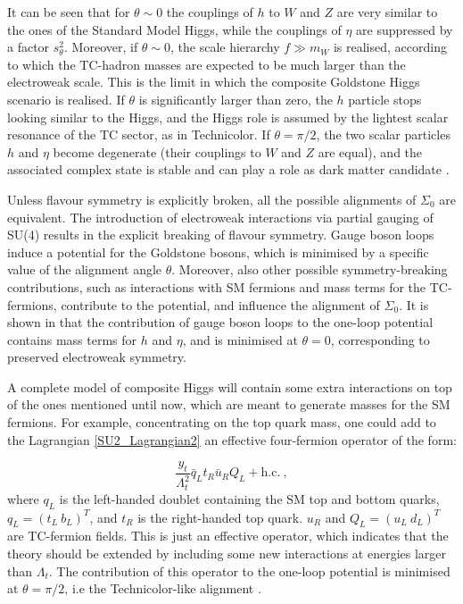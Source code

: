 It can be seen that for $\theta \sim 0$ the couplings of  $h$ to $W$ and $Z$ are very similar to the ones of the Standard Model Higgs, while the couplings of $\eta$ are suppressed by a factor $s_{\theta}^2$. Moreover, if $\theta \sim 0$, the scale hierarchy $f \gg m_W$ is realised,  according to which the TC-hadron masses are expected to be much larger than the electroweak scale. This is the limit in which the composite Goldstone Higgs scenario is realised. If $\theta$ is significantly larger than zero, the $h$ particle stops looking similar to the Higgs, and the Higgs role is assumed by the lightest scalar resonance of the TC sector, as in Technicolor. If $\theta = \pi/2$, the two scalar particles $h$ and $\eta$ become degenerate (their couplings to $W$ and $Z$ are equal), and the associated complex state is stable and can play a role as dark matter candidate \cite{Cacciapaglia:2014uja}.

Unless flavour symmetry is explicitly broken, all the possible alignments of $\Sigma_0$ are equivalent. The introduction of electroweak interactions via partial gauging of SU(4) results in the explicit breaking of flavour symmetry. Gauge boson loops induce a potential for the Goldstone bosons, which is minimised by a specific value of the alignment angle $\theta$. Moreover, also other possible symmetry-breaking contributions, such as interactions with SM fermions and mass terms for the TC-fermions, contribute to the potential, and influence the alignment of $\Sigma_0$. It is shown in \cite{Cacciapaglia:2014uja} that the contribution of gauge boson loops to the one-loop potential contains mass terms for $h$ and $\eta$, and is minimised at $\theta = 0$, corresponding to preserved electroweak symmetry.


A complete model of composite Higgs will contain some extra interactions on top of the ones mentioned until now, which are meant to generate masses for the SM fermions. For example, concentrating on the top quark mass, one could add to the Lagrangian \ref{SU2_Lagrangian2} an effective four-fermion operator of the form:

\begin{equation}
\frac{y_t}{\Lambda_t^2} \bar q_L t_R \bar u_R  Q_L  + \mathrm{h.c.} \: ,
\label{}
\end{equation}
%
where $q_L$ is the left-handed doublet containing the SM top and bottom quarks, $q_L = (t_L  \: b_L)^T$, and $t_R$ is the right-handed top quark. $u_R$ and $Q_L = (u_L \: d_L)^T$ are TC-fermion fields. This is just an effective operator, which indicates that the theory should be extended by including some new interactions at energies larger than $\Lambda_t$. The contribution of this operator to the one-loop potential is minimised at $\theta = \pi/2$, i.e the Technicolor-like alignment \cite{Cacciapaglia:2014uja}.

